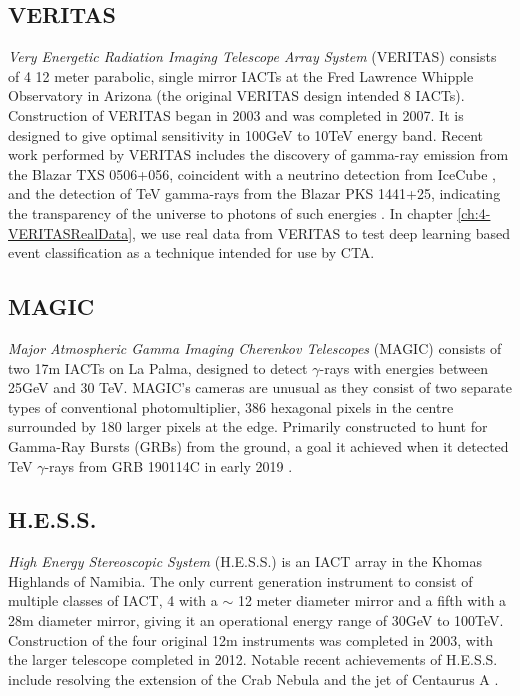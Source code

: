 \subsection{VERITAS}
\textit{Very Energetic Radiation Imaging Telescope Array System} (VERITAS) consists of 4 12 meter parabolic, single mirror IACTs at the Fred Lawrence Whipple Observatory in Arizona (the original VERITAS design intended 8 IACTs). Construction of VERITAS began in 2003 and was completed in 2007. It is designed to give optimal sensitivity in 100GeV to 10TeV energy band. Recent work performed by VERITAS includes the discovery of gamma-ray emission from the Blazar TXS 0506+056, coincident with a neutrino detection from IceCube \cite{TXS}, and the detection of TeV gamma-rays from the Blazar PKS 1441+25, indicating the transparency of the universe to photons of such energies \cite{escape}. In chapter \ref{ch:4-VERITASRealData}, we use real data from VERITAS to test deep learning based event classification as a technique intended for use by CTA.

\subsection{MAGIC}
\textit{Major Atmospheric Gamma Imaging Cherenkov Telescopes} (MAGIC) consists of two 17m IACTs on La Palma, designed to detect $\gamma$-rays with energies between 25GeV and 30 TeV. MAGIC's cameras are unusual as they consist of two separate types of conventional photomultiplier, 386 hexagonal pixels in the centre surrounded by 180 larger pixels at the edge. Primarily constructed to hunt for Gamma-Ray Bursts (GRBs) from the ground, a goal it achieved when it detected TeV $\gamma$-rays from GRB 190114C in early 2019 \cite{magicGRB}.
\subsection{H.E.S.S.}
\textit{High Energy Stereoscopic System} (H.E.S.S.) is an IACT array in the Khomas Highlands of Namibia. The only current generation instrument to consist of multiple classes of IACT, 4 with a $\sim$ 12 meter diameter mirror and a fifth with a 28m diameter mirror, giving it an operational energy range of 30GeV to 100TeV. Construction of the four original 12m instruments was completed in 2003, with the larger telescope completed in 2012. Notable recent achievements of H.E.S.S. include resolving the extension of the Crab Nebula \cite{crabextension} and the jet of Centaurus A \cite{cena}.

